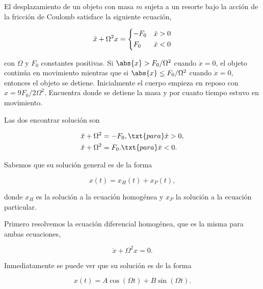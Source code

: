 \documentclass[../main.tex]{subfiles}
\begin{document}
\begin{problema}
	El desplazamiento de un objeto con masa \(m\) sujeta a un resorte
	bajo la acción de la fricción de Coulomb satisface la siguiente
	ecuación,

	\begin{equation}
		\ddot{x} + \Omega^{2}x =
		\begin{dcases}
			-F_{0} & \dot{x} > 0 \\
			F_{0}  & \dot{x} < 0 \\
		\end{dcases}
	\end{equation}

	con \(\Omega\) y \(F_{0}\) constantes positivas. Si \(\abs{x} > F_{0}/\Omega^{2}\)
	cuando \(\dot{x} = 0\), el objeto continúa en movimiento mientras
	que si \(\abs{x} \leq F_{0}/\Omega^{2}\) cuando \(\dot{x} = 0\),
	entonces el objeto se detiene. Inicialmente el cuerpo empieza
	en reposo con \(x = 9F_{0}/2\Omega^{2}\). Encuentra donde se detiene
	la masa y por cuanto tiempo estuvo en movimiento.
\end{problema}

\startsolution

Las dos encontrar solución son

\begin{align}
	\ddot{x} + \Omega^{2} & = -F_{0}, \txt{para} \dot{x} > 0,\label{eq:pos-greater-speed} \\
	\ddot{x} + \Omega^{2} & = F_{0}. \txt{para} \dot{x} < 0.\label{eq:pos-less-speed}
\end{align}

Sabemos que su solución general es de la forma

\begin{equation}
	x(t) = x_{H}(t) + x_{P}(t),
	\label{eq:sol-non-homegeneuous}
\end{equation}

donde \(x_{H}\) es la solución a la ecuación homogénea y \(x_{P}\) la solución
a la ecuación particular.

Primero resolvemos la ecuación diferencial homogénea, que es la misma para ambas
ecuaciones,

\begin{equation}
	\ddot{x} + \Omega^{2}x = 0.
	\label{eq:homoegeneous}
\end{equation}

Inmediatamente se puede ver que su solución es de la forma

\begin{equation}
	x(t) = A\cos(\Omega t) + B\sin(\Omega t).
	\label{eq:sol-cossin}
\end{equation}
\end{document}
